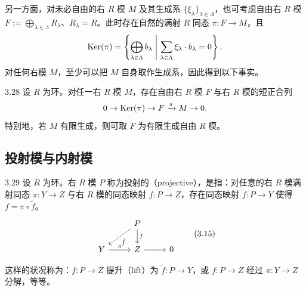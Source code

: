 另一方面，对未必自由的右 $R$ 模 $M$ 及其生成系 $\{\xi_\lambda\}_{\lambda\in\Lambda}$，也可考虑自由右 $R$ 模 $F:=\bigoplus_{\lambda\in\Lambda}R_\lambda$、$R_\lambda=R$。此时存在自然的满射 $R$ 同态 $\pi\colon F\to M$，且
\[
\operatorname{Ker}(\pi)=\left\{\bigoplus_{\lambda\in\Lambda}b_\lambda \;\middle|\; \sum_{\lambda\in\Lambda}\xi_\lambda\cdot b_\lambda=0\right\}.
\]
对任何右模 $M$，至少可以把 $M$ 自身取作生成系，因此得到以下事实。


\begin{proposition}{3.28}
设 $R$ 为环。对任一右 $R$ 模 $M$，存在自由右 $R$ 模 $F$ 与右 $R$ 模的短正合列
\[
0\to\operatorname{Ker}(\pi)\to F\xrightarrow{\pi}M\to 0.
\]
特别地，若 $M$ 有限生成，则可取 $F$ 为有限生成自由 $R$ 模。
\end{proposition}

\subsection{投射模与内射模}

\begin{definition}{3.29}
设 $R$ 为环。右 $R$ 模 $P$ 称为投射的（projective），是指：对任意的右 $R$ 模满射同态 $\pi\colon Y\to Z$ 与右 $R$ 模的同态映射 $f\colon P\to Z$，存在同态映射 $\tilde f\colon P\to Y$ 使得 $f=\pi\circ\tilde f$。
\begin{equation}
\begin{tikzcd}[row sep=1.7em, column sep=2.6em]
& P \arrow[dl,dashed,"\tilde f"] \arrow[d,"f"] & \\
Y \arrow[r,"\pi"] & Z \arrow[r] & 0
\end{tikzcd} \tag{3.15}
\end{equation}
\end{definition}

这样的状况称为：$f\colon P\to Z$ 提升（lift）为 $\tilde f\colon P\to Y$，或 $f\colon P\to Z$ 经过 $\pi\colon Y\to Z$ 分解，等等。


